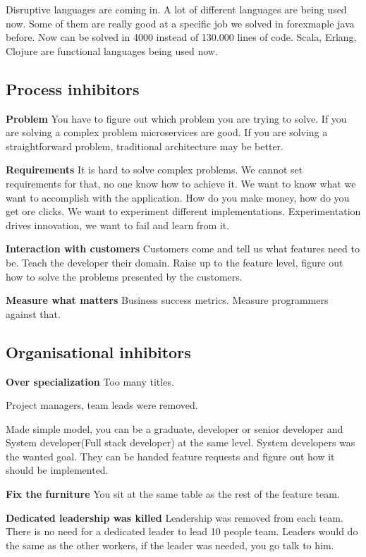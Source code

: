 {Disruptive languages are coming in. A lot of different languages are being used now. Some of them are really good at a specific job we solved in forexmaple java before. Now can be solved in 4000 instead of 130.000 lines of code. Scala, Erlang, Clojure are functional languages being used now.


\subsection{Process inhibitors}
\textbf{Problem}
You have to figure out which problem you are trying to solve. If you are solving a complex problem microservices are good. If you are solving a straightforward problem, traditional architecture may be better.

\textbf{Requirements}
It is hard to solve complex problems. We cannot set requirements for that, no one know how to achieve it. We want to know what we want to accomplish with the application. How do you make money, how do you get ore clicks. We want to experiment different implementations. Experimentation drives innovation, we want to fail and learn from it. 

\textbf{Interaction with customers}
Customers come and tell us what features need to be. Teach the developer their domain. Raise up to the feature level, figure out how to solve the problems presented by the customers.

\textbf{Measure what matters}
Business success metrics. Measure programmers against that. 

\subsection{Organisational inhibitors}
\textbf{Over specialization}
Too many titles. 

Project managers, team leads were removed. 

Made simple model, you can be a graduate, developer or senior developer and System developer(Full stack developer) at the same level. System developers was the wanted goal. They can be handed feature requests and figure out how it should be implemented.

\textbf{Fix the furniture}
You sit at the same table as the rest of the feature team.

\textbf{Dedicated leadership was killed}
Leadership was removed from each team. There is no need for a dedicated leader to lead 10 people team.
Leaders would do the same as the other workers, if the leader was needed, you go talk to him.

}
